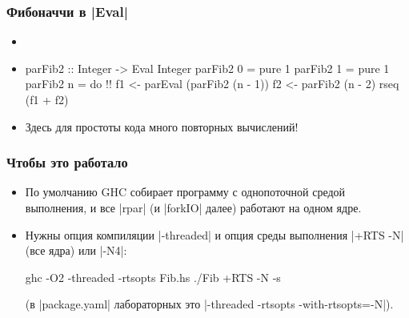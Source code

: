 \documentclass[11pt]{beamer}
\begin{document}
\begin{frame}[fragile]
  \frametitle{Фибоначчи в \haskinline|Eval|}
  \begin{itemize}
    \item
          \pause
    \item
          \begin{haskellsmall}
            parFib2 :: Integer -> Eval Integer
            parFib2 0 = pure 1
            parFib2 1 = pure 1
            parFib2 n = do !\pause!
              f1 <- parEval (parFib2 (n - 1))
              f2 <- parFib2 (n - 2)
              rseq (f1 + f2)
          \end{haskellsmall}
          \pause
    \item Здесь для простоты кода много повторных вычислений!
  \end{itemize}
\end{frame}

\begin{frame}[fragile]
  \frametitle{Чтобы это работало}
  \begin{itemize}
    \item По умолчанию GHC собирает программу с однопоточной средой выполнения, и все \haskinline|rpar| (и \haskinline|forkIO| далее) работают на одном ядре.
    \item Нужны опция компиляции \ghcinline|-threaded| и опция среды выполнения \ghcinline|+RTS -N| (все ядра) или \ghcinline|-N4|:
          \begin{ghcismall}
            ghc -O2 -threaded -rtsopts Fib.hs
            ./Fib +RTS -N -s
          \end{ghcismall}
          (в \ghcinline|package.yaml| лабораторных это \ghcinline|-threaded -rtsopts -with-rtsopts=-N|).
  \end{itemize}
\end{frame}
\end{document}
